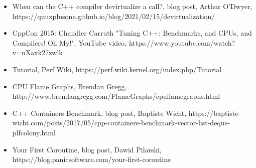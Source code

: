 

\begin{itemize}
\item 
When can the C++ compiler devirtualize a call?, blog post, Arthur O'Dwyer, https://quuxplusone.github.io/blog/2021/02/15/devirtualization/

\item 
CppCon 2015: Chandler Carruth "Tuning C++: Benchmarks, and CPUs, and Compilers! Oh My!", YouTube video, https://www.youtube.com/watch?v=nXaxk27zwlk

\item 
Tutorial, Perf Wiki, https://perf.wiki.kernel.org/index.php/Tutorial

\item 
CPU Flame Graphs, Brendan Gregg, http://www.brendangregg.com/FlameGraphs/cpuflamegraphs.html

\item 
C++ Containers Benchmark, blog post, Baptiste Wicht, https://baptiste-wicht.com/posts/2017/05/cpp-containers-benchmark-vector-list-deque-plfcolony.html

\item 
Your First Coroutine, blog post, Dawid Pilarski, https://blog.panicsoftware.com/your-first-coroutine
\end{itemize}